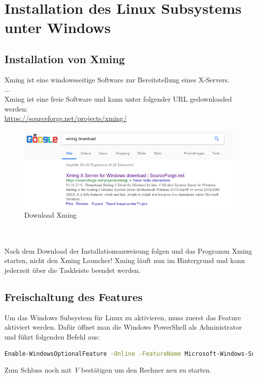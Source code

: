 \section{Installation des Linux Subsystems unter Windows}
\subsection{Installation von Xming}
Xming ist eine windowsseitige Software zur Bereitstellung eines X-Servers.\\
...\\
Xming ist eine freie Software und kann unter folgender URL gedownloaded werden:\\
\url{https://sourceforge.net/projects/xming/}

\begin{figure}[h!]
\centering
\includegraphics[scale=0.7]{Bilder/Xming.PNG}
\caption{Download Xming}
\label{fig:Xming}
\end{figure}\\ \\Nach dem Download der Installationsanweisung folgen und das Programm Xming starten, nicht den Xming Launcher! Xming läuft nun im Hintergrund und kann jederzeit über die Taskleiste beendet werden.

\subsection{Freischaltung des Features}
Um das Windows Subsystem für Linux zu aktivieren, muss zuerst das Feature aktiviert werden. Dafür öffnet man die Windows PowerShell als Administrator und führt folgenden Befehl aus:
\begin{lstlisting}[language=bash]
Enable-WindowsOptionalFeature -Online -FeatureName Microsoft-Windows-Subsystem-Linux
\end{lstlisting}

Zum Schluss noch mit \textit{Y} bestätigen um den Rechner neu zu starten.


